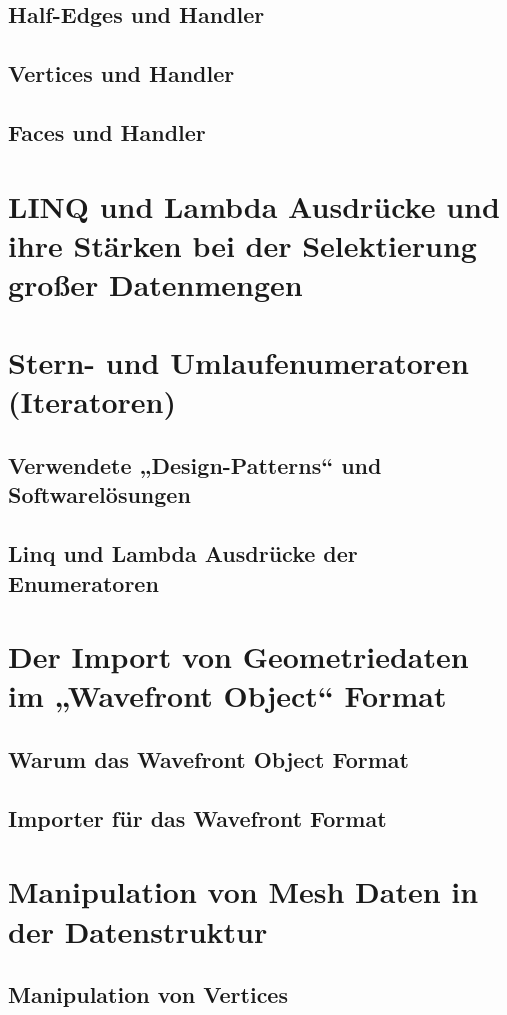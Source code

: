 \documentclass[12pt,a4paper]{scrreprt}
\begin{document}
		\subsection {Half-Edges und Handler}
		\subsection {Vertices und Handler}
		\subsection {Faces und Handler}
	\section {LINQ und Lambda Ausdrücke und ihre Stärken bei der Selektierung großer Datenmengen}
	\section {Stern- und Umlaufenumeratoren (Iteratoren)}
		\subsection {Verwendete „Design-Patterns“ und Softwarelösungen}
		\subsection {Linq und Lambda Ausdrücke der Enumeratoren}
	\section {Der Import von Geometriedaten im „Wavefront Object“ Format}
		\subsection {Warum das Wavefront Object Format}
		\subsection {Importer für das Wavefront Format}
	\section {Manipulation von Mesh Daten in der Datenstruktur}
		\subsection {Manipulation von Vertices}
\end{document}
